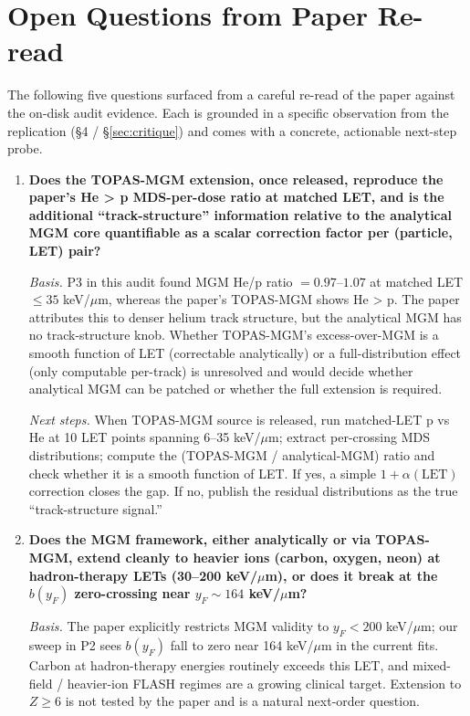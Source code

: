 \section{Open Questions from Paper Re-read}

The following five questions surfaced from a careful re-read of the paper
against the on-disk audit evidence. Each is grounded in a specific
observation from the replication (\S 4 / \S \ref{sec:critique}) and comes
with a concrete, actionable next-step probe.

\begin{enumerate}
  \item \textbf{Does the TOPAS-MGM extension, once released, reproduce the
    paper's He > p MDS-per-dose ratio at matched LET, and is the
    additional ``track-structure'' information relative to the analytical
    MGM core quantifiable as a scalar correction factor per (particle, LET)
    pair?}

    \emph{Basis.} P3 in this audit found MGM He/p ratio $= 0.97$--$1.07$
    at matched LET $\le 35$ keV/$\mu$m, whereas the paper's TOPAS-MGM
    shows He > p. The paper attributes this to denser helium track
    structure, but the analytical MGM has no track-structure knob. Whether
    TOPAS-MGM's excess-over-MGM is a smooth function of LET (correctable
    analytically) or a full-distribution effect (only computable
    per-track) is unresolved and would decide whether analytical MGM can
    be patched or whether the full extension is required.

    \emph{Next steps.} When TOPAS-MGM source is released, run matched-LET
    p vs He at 10 LET points spanning 6--35 keV/$\mu$m; extract
    per-crossing MDS distributions; compute the
    (TOPAS-MGM / analytical-MGM) ratio and check whether it is a smooth
    function of LET. If yes, a simple $1 + \alpha(\text{LET})$ correction
    closes the gap. If no, publish the residual distributions as the true
    ``track-structure signal.''

  \item \textbf{Does the MGM framework, either analytically or via
    TOPAS-MGM, extend cleanly to heavier ions (carbon, oxygen, neon) at
    hadron-therapy LETs (30--200 keV/$\mu$m), or does it break at the
    $b(y_F)$ zero-crossing near $y_F \sim 164$ keV/$\mu$m?}

    \emph{Basis.} The paper explicitly restricts MGM validity to $y_F <
    200$ keV/$\mu$m; our sweep in P2 sees $b(y_F)$ fall to zero near
    164 keV/$\mu$m in the current fits. Carbon at hadron-therapy energies
    routinely exceeds this LET, and mixed-field / heavier-ion FLASH
    regimes are a growing clinical target. Extension to $Z \ge 6$ is not
    tested by the paper and is a natural next-order question.


\end{enumerate}
